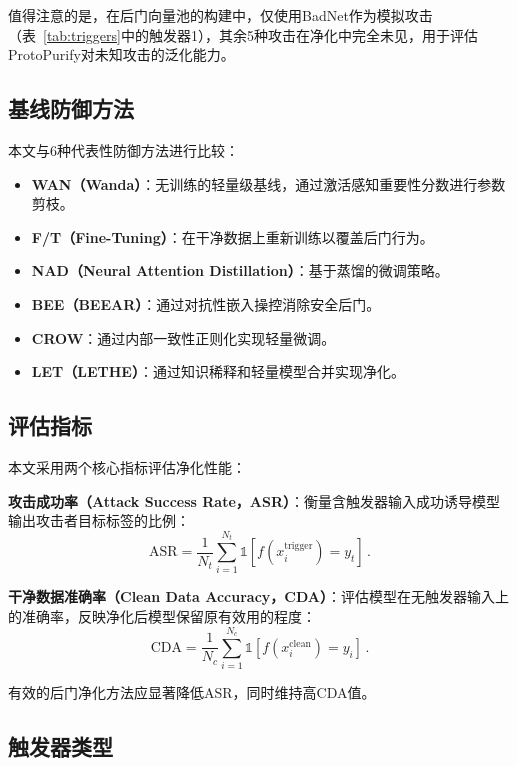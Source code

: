 {\sloppy 
值得注意的是，在后门向量池的构建中，仅使用BadNet作为模拟攻击（表~\ref{tab:triggers}中的触发器1），其余5种攻击在净化中完全未见，用于评估ProtoPurify对未知攻击的泛化能力。
\par}

\subsection{基线防御方法}

本文与6种代表性防御方法进行比较：
\begin{itemize}[leftmargin=2em]
    \item \textbf{WAN（Wanda）}：无训练的轻量级基线，通过激活感知重要性分数进行参数剪枝。
    \item \textbf{F/T（Fine-Tuning）}：在干净数据上重新训练以覆盖后门行为。
    \item \textbf{NAD（Neural Attention Distillation）}：基于蒸馏的微调策略。
    \item \textbf{BEE（BEEAR）}：通过对抗性嵌入操控消除安全后门。
    \item \textbf{CROW}：通过内部一致性正则化实现轻量微调。
    \item \textbf{LET（LETHE）}：通过知识稀释和轻量模型合并实现净化。
\end{itemize}

\subsection{评估指标}

本文采用两个核心指标评估净化性能：

\textbf{攻击成功率（Attack Success Rate，ASR）}：衡量含触发器输入成功诱导模型输出攻击者目标标签的比例：
\begin{equation}
\text{ASR} = \frac{1}{N_t}\sum_{i=1}^{N_t} \mathds{1}\left[f(x_i^{\text{trigger}}) = y_t\right] \, .
\end{equation}

\textbf{干净数据准确率（Clean Data Accuracy，CDA）}：评估模型在无触发器输入上的准确率，反映净化后模型保留原有效用的程度：
\begin{equation}
\text{CDA} = \frac{1}{N_c}\sum_{i=1}^{N_c} \mathds{1}\left[f(x_i^{\text{clean}}) = y_i\right] \, .
\end{equation}

有效的后门净化方法应显著降低ASR，同时维持高CDA值。

\subsection{触发器类型}

